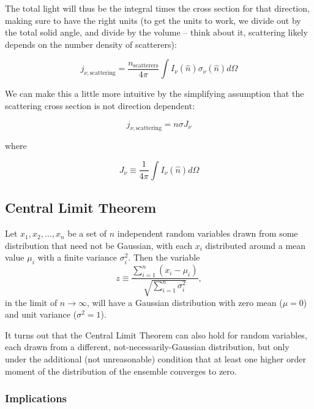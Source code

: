 \documentclass{article}
\begin{document}
The total light will thus be the integral times the cross section for that direction, making sure to have the right units (to get the units to work, we divide out by the total solid angle, and divide by the volume -- think about it, scattering likely depends on the number density of scatterers):

\begin{equation}
    j_{\nu,\text{scattering}} = \frac{n_{\text{scatterers}}}{4\pi}\int I_\nu (\hat{n}) \sigma_\nu (\hat{n}) d \Omega 
\end{equation}

We can make this a little more intuitive by the simplifying assumption that the scattering cross section is not direction dependent:

\begin{equation}
    j_{\nu,\text{scattering}} = n \sigma J_\nu
\end{equation}

where

\begin{equation}
    J_\nu \equiv \frac{1}{4\pi}\int I_\nu(\hat{n}) d \Omega
\end{equation}

\subsection{Central Limit Theorem}

Let $x_1,x_2,\dots,x_n$ be a set of $n$ independent random variables drawn from some distribution that need not be Gaussian, with each $x_i$ distributed around a mean value $\mu_i$ with a finite variance $\sigma_i^2$.  Then
the variable
\begin{equation}
z\equiv\frac{\sum_{i=1}^n{(x_i-\mu_i)}}{\sqrt{\sum_{i=1}^n{\sigma_i^2}}},
\end{equation}
in the limit of $n\to\infty$, will have a Gaussian distribution with zero mean ($\mu=0$) and unit variance ($\sigma^2=1$).

It turns out that the Central Limit Theorem can also hold for random variables, each drawn from a different, not-necessarily-Gaussian distribution, but only under the additional (not unreasonable) condition that at least one higher order moment of the distribution of the ensemble converges to zero.

\subsubsection{Implications}
\end{document}
